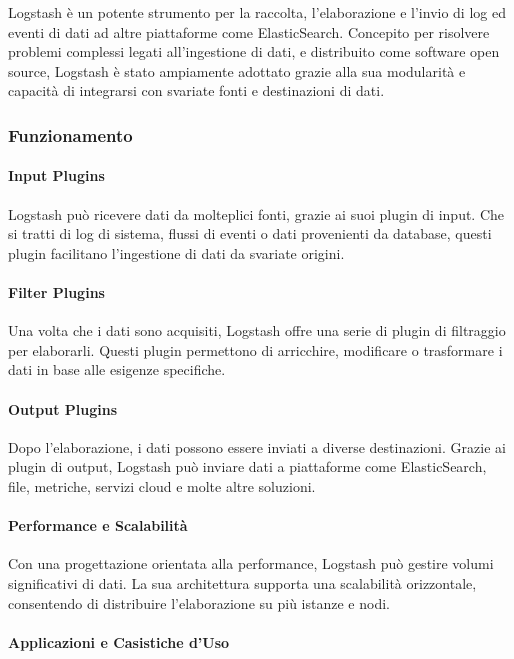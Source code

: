 Logstash è un potente strumento per la raccolta, l'elaborazione e l'invio di log ed eventi di dati ad altre piattaforme come ElasticSearch. Concepito per risolvere problemi complessi legati all'ingestione di dati, e distribuito come software open source, Logstash è stato ampiamente adottato grazie alla sua modularità e capacità di integrarsi con svariate fonti e destinazioni di dati.

\subsubsection{Funzionamento}

\paragraph{Input Plugins}
Logstash può ricevere dati da molteplici fonti, grazie ai suoi plugin di input. Che si tratti di log di sistema, flussi di eventi o dati provenienti da database, questi plugin facilitano l'ingestione di dati da svariate origini.

\paragraph{Filter Plugins}
Una volta che i dati sono acquisiti, Logstash offre una serie di plugin di filtraggio per elaborarli. Questi plugin permettono di arricchire, modificare o trasformare i dati in base alle esigenze specifiche.

\paragraph{Output Plugins}
Dopo l'elaborazione, i dati possono essere inviati a diverse destinazioni. Grazie ai plugin di output, Logstash può inviare dati a piattaforme come ElasticSearch, file, metriche, servizi cloud e molte altre soluzioni.

\paragraph{Performance e Scalabilità}

Con una progettazione orientata alla performance, Logstash può gestire volumi significativi di dati. La sua architettura supporta una scalabilità orizzontale, consentendo di distribuire l'elaborazione su più istanze e nodi.

\paragraph{Applicazioni e Casistiche d'Uso}

